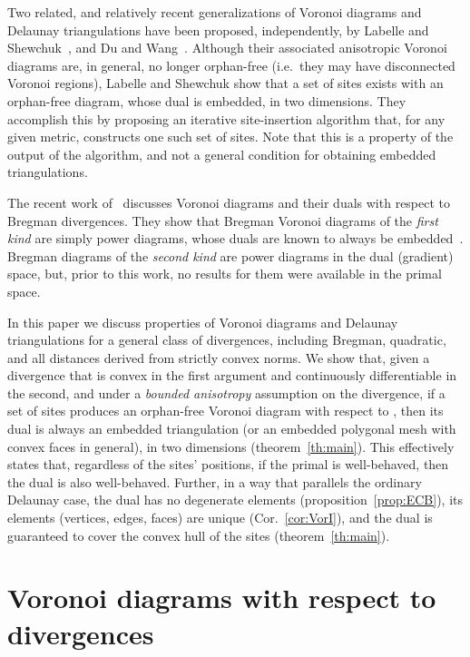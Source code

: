 \documentclass[11pt]{article}
\begin{document}
Two related, and relatively recent generalizations of Voronoi diagrams and Delaunay triangulations have been proposed, 
independently, by Labelle and Shewchuk~\cite{LS}, and Du and Wang~\cite{DW}. 
Although their associated anisotropic Voronoi diagrams are, in general, no longer orphan-free
(i.e.~they may have disconnected Voronoi regions), 
Labelle and Shewchuk show that a set of sites exists 
with an orphan-free diagram, whose dual is embedded, in two dimensions. 
They accomplish this by proposing an iterative site-insertion algorithm
that, for any given metric, constructs one such set of sites. 
Note that this is a property of the output of the algorithm, and not a general condition for obtaining embedded triangulations. 


The recent work of~\cite{Bregman} discusses Voronoi diagrams and their duals with respect to Bregman divergences. 
They show that Bregman Voronoi diagrams of the \emph{first kind} are simply power diagrams, 
	whose duals are known to always be embedded~\cite{powerdiag}. 
Bregman diagrams of the \emph{second kind} are power diagrams in the dual (gradient) space, 
	but, prior to this work, no results for them were available in the primal space. 


In this paper we discuss properties of Voronoi diagrams and Delaunay triangulations for 
	a general class of divergences, 
	including Bregman, quadratic, and all distances derived from strictly convex  norms. 
We show that, 
given a divergence  that is convex in the first argument and continuously differentiable in the second, 
	and under a \emph{bounded anisotropy} assumption on the divergence, 
 if a set of sites produces an orphan-free 
Voronoi diagram with respect to ,
then its dual is always an embedded triangulation 
	(or an embedded polygonal mesh with convex faces in general), 
in two dimensions (theorem~\ref{th:main}). 
This effectively states that, regardless of the sites' positions, if the primal 
is well-behaved, then the dual is also well-behaved. 
Further, in a way that parallels the ordinary Delaunay case, the dual has no
degenerate elements (proposition~\ref{prop:ECB}), its elements (vertices, edges, faces) 
are unique (Cor.~\ref{cor:VorI}), and the dual is guaranteed to cover the convex hull of the sites (theorem~\ref{th:main}). 











\section{Voronoi diagrams with respect to divergences}\label{sec:setup}
\end{document}
